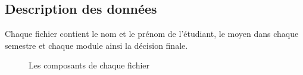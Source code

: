 \documentclass{article}
\begin{document}
            \subsection{Description des données}
                Chaque fichier contient le nom et le prénom de l’étudiant, le moyen dans chaque semestre et chaque module ainsi la décision finale.\\
                \begin{figure}[h!]
                    \centering
                    \caption{Les composants de chaque fichier}
                    \label{fig:columns}
                \end{figure} 
\end{document}

